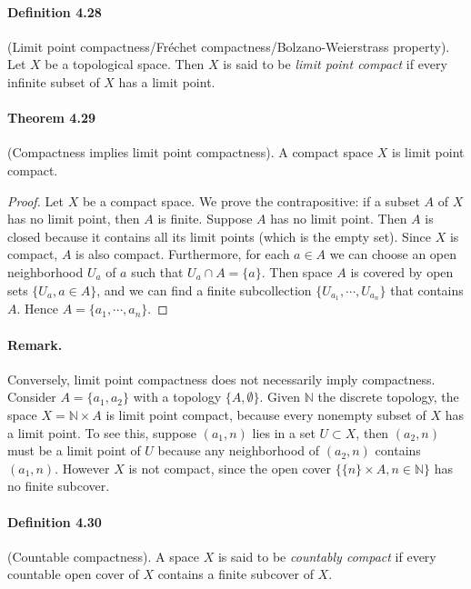 \documentclass{article}
\numberwithin{equation}{section}
\theoremstyle{plain}
\theoremstyle{definition}
\begin{document}
\paragraph{Definition 4.28\label{def:4.28}} (Limit point compactness/Fréchet compactness/Bolzano-Weierstrass property). Let $X$ be a topological space. Then $X$ is said to be \textit{limit point compact} if every infinite subset of $X$ has a limit point.

\paragraph{Theorem 4.29\label{thm:4.29}} (Compactness implies limit point compactness). A compact space $X$ is limit point compact.
\begin{proof}
Let $X$ be a compact space. We prove the contrapositive: if a subset $A$ of $X$ has no limit point, then $A$ is finite. Suppose $A$ has no limit point. Then $A$ is closed because it contains all its limit points (which is the empty set). Since $X$ is compact, $A$ is also compact. Furthermore, for each $a\in A$ we can choose an open neighborhood $U_a$ of $a$ such that $U_a\cap A=\{a\}$. Then space $A$ is covered by open sets $\{U_a,a\in A\}$, and we can find a finite subcollection $\{U_{a_1},\cdots,U_{a_n}\}$ that contains $A$. Hence $A=\{a_1,\cdots,a_n\}$.
\end{proof}

\paragraph{Remark.} Conversely, limit point compactness does not necessarily imply compactness. Consider $A=\{a_1,a_2\}$ with a topology $\{A,\emptyset\}$. Given $\mathbb{N}$ the discrete topology, the space $X=\mathbb{N}\times A$ is limit point compact, because every nonempty subset of $X$ has a limit point. To see this, suppose $(a_1,n)$ lies in a set $U\subset X$, then $(a_2,n)$ must be a limit point of $U$ because any neighborhood of $(a_2,n)$ contains $(a_1,n)$. However $X$ is not compact, since the open cover $\{\{n\}\times A,n\in\mathbb{N}\}$ has no finite subcover.

\paragraph{Definition 4.30\label{def:4.30}} (Countable compactness). A space $X$ is said to be \textit{countably compact} if every countable open cover of $X$ contains a finite subcover of $X$.
\end{document}
